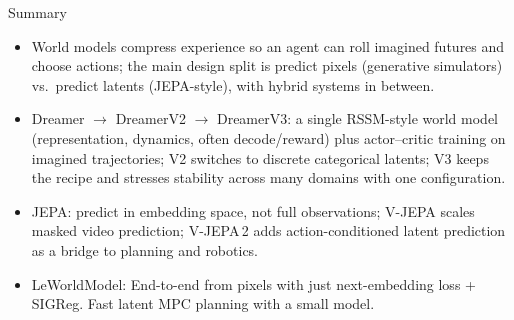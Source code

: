 \begin{frame}[t]{Summary}
  \begin{itemize}\itemsep0.22em\footnotesize
    \item World models compress experience so an agent can roll imagined futures and choose actions; the main design split is predict pixels (generative simulators) vs.\ predict latents (JEPA-style), with hybrid systems in between.
    \item Dreamer $\rightarrow$ DreamerV2 $\rightarrow$ DreamerV3: a single RSSM-style world model (representation, dynamics, often decode/reward) plus actor--critic training on imagined trajectories; V2 switches to discrete categorical latents; V3 keeps the recipe and stresses stability across many domains with one configuration.
    \item JEPA: predict in embedding space, not full observations; V-JEPA scales masked video prediction; V-JEPA\,2 adds action-conditioned latent prediction as a bridge to planning and robotics.
    \item LeWorldModel: End-to-end from pixels with just next-embedding loss + SIGReg. Fast latent MPC planning with a small model.
  \end{itemize}
\end{frame}

